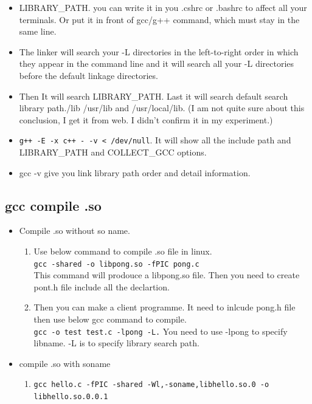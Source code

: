 \documentclass[a4paper,12pt,twoside]{book}
\begin{document}
\begin{itemize}
\begin{itemize}
\begin{itemize}
   \item LIBRARY\_PATH. you can write it in you .cshrc or .bashrc to affect all your terminals. Or put it in front of gcc/g++ command, which must stay in the same line.        
	 
	\item The linker will search your -L directories in the left-to-right order in which they appear in the command line and it will search all your -L directories before the default linkage directories.
	
	\item Then It will search LIBRARY\_PATH. Last it will search default search library path./lib /usr/lib and /usr/local/lib. (I am not quite sure about this conclusion, I get it from web. I didn't confirm it in my experiment.)
	
	\item \verb=g++ -E -x c++ - -v < /dev/null=. It will show all the include path and LIBRARY\_PATH and COLLECT\_GCC options.

	\item gcc -v give you link library path order and detail information. 
	\end{itemize}

\subsection{gcc compile .so}
  \begin{itemize}
  \item Compile .so without so name.
	\begin{enumerate}
	\item Use below command to compile .so file in linux. \\
   \verb=gcc -shared -o libpong.so -fPIC pong.c= \\
   This command will prodouce a libpong.so file. Then you need to create pont.h file include all the declartion. 
   
   \item Then you can make a client programme. It need to inlcude pong.h file then use below gcc command to compile. \\
	\verb=gcc -o test test.c -lpong -L.=
	You need to use -lpong to specify libname. -L is to specify library search path.        
	\end{enumerate}

       \item compile .so with soname 
       \begin{enumerate}
		\item \verb=gcc hello.c -fPIC -shared -Wl,-soname,libhello.so.0 -o libhello.so.0.0.1= 
		

\end{enumerate}
\end{itemize}
\end{itemize}
\end{itemize}
\end{document}
